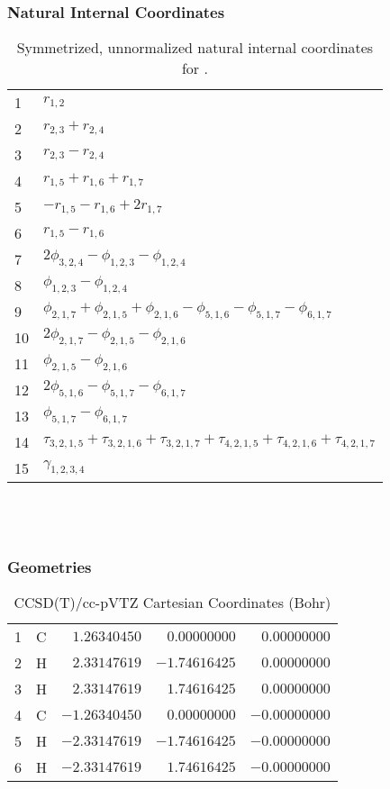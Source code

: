 \documentclass[10pt,oneside]{article}
\begin{document}
\clearpage

\subsubsection*{Natural Internal Coordinates}
\begin{table}[h!]
\centering
\caption{Symmetrized, unnormalized natural internal coordinates for .}
\small
\begin{tabular}{ll}
  1   & $r_{1,2}$ \\
  2   & $r_{2,3} + r_{2,4}$ \\
  3   & $r_{2,3} - r_{2,4}$ \\
  4   & $r_{1,5} + r_{1,6} + r_{1,7}$ \\
  5   & $-r_{1,5} - r_{1,6} + 2r_{1,7}$ \\
  6   & $r_{1,5} - r_{1,6}$ \\
  7   & $2\phi_{3,2,4} - \phi_{1,2,3} - \phi_{1,2,4}$ \\
  8   & $\phi_{1,2,3} - \phi_{1,2,4}$ \\
  9   & $\phi_{2,1,7} + \phi_{2,1,5} + \phi_{2,1,6} - \phi_{5,1,6} - \phi_{5,1,7} - \phi_{6,1,7}$ \\
  10  & $2\phi_{2,1,7} - \phi_{2,1,5} - \phi_{2,1,6}$ \\
  11  & $\phi_{2,1,5} - \phi_{2,1,6}$ \\
  12  & $2\phi_{5,1,6} - \phi_{5,1,7} - \phi_{6,1,7}$ \\
  13  & $\phi_{5,1,7} - \phi_{6,1,7}$ \\
  14  & $\tau_{3,2,1,5} + \tau_{3,2,1,6} + \tau_{3,2,1,7} + \tau_{4,2,1,5} + \tau_{4,2,1,6} + \tau_{4,2,1,7}$ \\
  15  & $\gamma_{1,2,3,4}$ \\
\end{tabular}
\end{table}

\clearpage

\subsection{\ \ \ }

\subsubsection*{Geometries}
\begin{table}[h!]
\centering
\caption{CCSD(T)/cc-pVTZ Cartesian Coordinates (Bohr)}
\begin{tabular}{llrrr}
1  & C  & $ 1.26340450$ & $ 0.00000000$ & $ 0.00000000$ \\
2  & H  & $ 2.33147619$ & $-1.74616425$ & $ 0.00000000$ \\
3  & H  & $ 2.33147619$ & $ 1.74616425$ & $ 0.00000000$ \\
4  & C  & $-1.26340450$ & $ 0.00000000$ & $-0.00000000$ \\
5  & H  & $-2.33147619$ & $-1.74616425$ & $-0.00000000$ \\
6  & H  & $-2.33147619$ & $ 1.74616425$ & $-0.00000000$ \\
\end{tabular}
\end{table}
\end{document}
